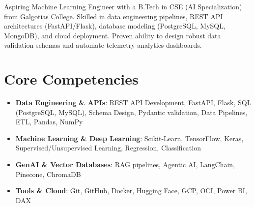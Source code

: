 \documentclass[11pt,a4paper,sans]{moderncv}
\begin{document}
\makecvtitle

\vspace{6pt}
\small{Aspiring Machine Learning Engineer with a B.Tech in CSE (AI Specialization) from Galgotias College. Skilled in data engineering pipelines, REST API architectures (FastAPI/Flask), database modeling (PostgreSQL, MySQL, MongoDB), and cloud deployment. Proven ability to design robust data validation schemas and automate telemetry analytics dashboards.}

\section{Core Competencies}
\vspace{1pt}
\begin{itemize}
\item \textbf{Data Engineering \& APIs}: REST API Development, FastAPI, Flask, SQL (PostgreSQL, MySQL), Schema Design, Pydantic validation, Data Pipelines, ETL, Pandas, NumPy
\item \textbf{Machine Learning \& Deep Learning}: Scikit-Learn, TensorFlow, Keras, Supervised/Unsupervised Learning, Regression, Classification
\item \textbf{GenAI \& Vector Databases}: RAG pipelines, Agentic AI, LangChain, Pinecone, ChromaDB
\item \textbf{Tools \& Cloud}: Git, GitHub, Docker, Hugging Face, GCP, OCI, Power BI, DAX
\end{itemize}
\end{document}

